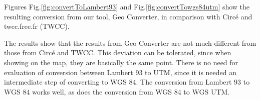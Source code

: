 Figures Fig.\ref{fig:convertToLambert93} and Fig.\ref{fig:convertTowgs84utm} show the resulting conversion from our tool, Geo Converter, in comparison with Circ\'e and twcc.free.fr (TWCC).


\begin{figure}[ht!]
\end{figure}


\begin{figure}[ht!]
\end{figure}

 The results show that the results from Geo Converter are not much different from those from Circ\'e and TWCC. This deviation can be tolerated, since when showing on the map, they are basically the same point.
There is no need for evaluation of conversion between Lambert 93 to UTM, since it is needed an intermediate step of converting to WGS 84. The conversion from Lambert 93 to WGS 84 works well, as does the conversion from WGS 84 to WGS UTM.

